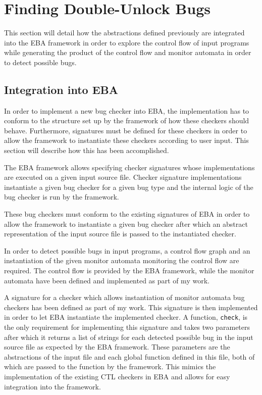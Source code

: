\section{Finding Double-Unlock Bugs}
This section will detail how the abstractions defined previously are integrated into the EBA framework in order to explore the control flow of input programs while generating the product of the control flow and monitor automata in order to detect possible bugs. 

\subsection{Integration into EBA}
In order to implement a new bug checker into EBA, the implementation has to conform to the structure set up by the framework of how these checkers should behave. Furthermore, signatures must be defined for these checkers in order to allow the framework to instantiate these checkers according to user input. This section will describe how this has been accomplished.  

\newpar The EBA framework allows specifying checker signatures whose implementations are executed on a given input source file. Checker signature implementations instantiate a given bug checker for a given bug type and the internal logic of the bug checker is run by the framework. 

\newpar These bug checkers must conform to the existing signatures of EBA in order to allow the framework to instantiate a given bug checker after which an abstract representation of the input source file is passed to the instantiated checker. 

\newpar In order to detect possible bugs in input programs, a control flow graph and an instantiation of the given monitor automata monitoring the control flow are required. The control flow is provided by the EBA framework, while the monitor automata have been defined and implemented as part of my work. 

\newpar A signature for a checker which allows instantiation of monitor automata bug checkers has been defined as part of my work. This signature is then implemented in order to let EBA instantiate the implemented checker. A function, \texttt{check}, is the only requirement for implementing this signature and takes two parameters after which it returns a list of strings for each detected possible bug in the input source file as expected by the EBA framework. These parameters are the abstractions of the input file and each global function defined in this file, both of which are passed to the function by the framework. This mimics the implementation of the existing CTL checkers in EBA and allows for easy integration into the framework. 

